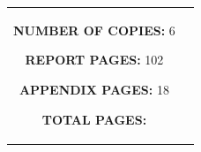 \begin{titlepage}
\begin{nopagebreak}
{\begin{tabular}{cc}
{\begin{description}
        \item {\bf NUMBER OF COPIES:} 6
        \item {\bf REPORT PAGES:} 102
        \item {\bf APPENDIX PAGES:} 18
        \item {\bf TOTAL PAGES:} \pageref{LastPage}
\end{description}

\vfill } &
\parbox{7cm}{
  \vspace{.15cm}
  \flushright
}
\end{tabular}
}

\end{nopagebreak}
\end{titlepage}